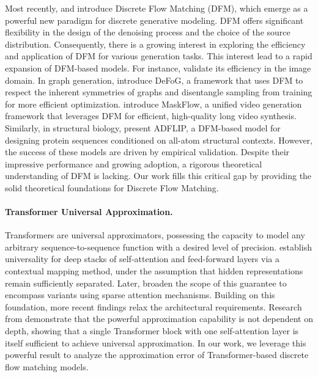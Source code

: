 \documentclass[12pt]{article}
\numberwithin{equation}{section}
\let\cite\citep
\theoremstyle{theoremstyle}
\numberwithin{equation}{section}
\numberwithin{theorem}{section}
\numberwithin{proposition}{section}
\numberwithin{definition}{section}
\numberwithin{lemma}{section}
\numberwithin{assumption}{section}
\numberwithin{remark}{section}
\begin{document}
Most recently,   \citet{campbell2024generative} and \cite{gat2024discrete} introduce Discrete Flow Matching (DFM), which emerge as a powerful new paradigm for discrete generative modeling. 
DFM offers significant flexibility in the design of the denoising process and the choice of the source distribution. 
Consequently, there is a growing interest in exploring the efficiency and application of DFM for various generation tasks.
This interest lead to a rapid expansion of DFM-based models. 
For instance, \cite{hu2024mask} validate its efficiency in the image domain. 
In graph generation, \citet{qin2024defog} introduce DeFoG, a framework that uses DFM to respect the inherent symmetries of graphs and disentangle sampling from training for more efficient optimization. 
\citet{fuest2025maskflow} introduce MaskFlow, a unified video generation framework that leverages DFM for efficient, high-quality long video synthesis. 
Similarly, in structural biology, \citet{yi2025all} present ADFLIP, a DFM-based model for designing protein sequences conditioned on all-atom structural contexts.
However, the success of these models are driven by empirical validation. 
Despite their impressive performance and growing adoption, a rigorous theoretical understanding of DFM is lacking. 
Our work fills this critical gap by providing the solid theoretical foundations for Discrete Flow Matching.


\paragraph{Transformer Universal Approximation.}
Transformers are universal approximators, possessing the capacity to model any arbitrary sequence-to-sequence function with a desired level of precision.
\citet{yun2019transformers} establish universality for deep stacks of self-attention and feed-forward layers via a contextual mapping method, under the assumption that hidden representations remain sufficiently separated. 
Later, \cite{alberti2023sumformer} broaden the scope of this guarantee to encompass variants using sparse attention mechanisms.
Building on this foundation, more recent findings relax the architectural requirements. Research from \citet{hu2024fundamental,kajitsuka2023transformers} demonstrate that the powerful approximation capability is not dependent on depth, showing that a single Transformer block with one self-attention layer is itself sufficient to achieve universal approximation.
In our work, we leverage this powerful result to analyze the approximation error of Transformer-based discrete flow matching models.
\end{document}
